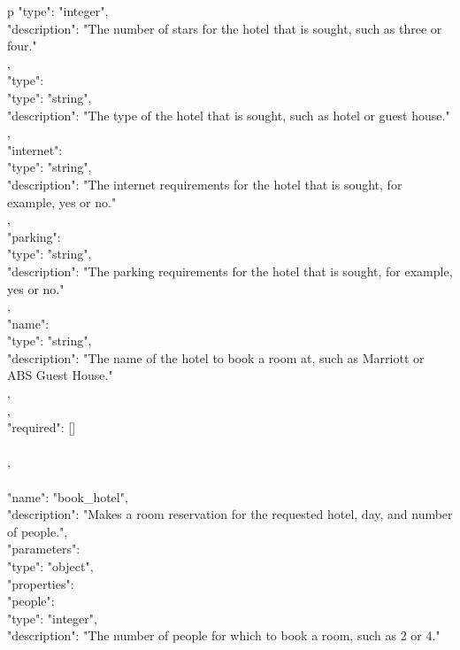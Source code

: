 \begin{table*}
\begin{tabular}{p\linewidth}
{{{{                    "type": "integer",\\
                    "description": "The number of stars for the hotel that is sought, such as three or four."\\
                },\\
                "type": {\\
                    "type": "string",\\
                    "description": "The type of the hotel that is sought, such as hotel or guest house."\\
                },\\
                "internet": {\\
                    "type": "string",\\
                    "description": "The internet requirements for the hotel that is sought, for example, yes or no."\\
                },\\
                "parking": {\\
                    "type": "string",\\
                    "description": "The parking requirements for the hotel that is sought, for example, yes or no."\\
                },\\
                "name": {\\
                    "type": "string",\\
                    "description": "The name of the hotel to book a room at, such as Marriott or ABS Guest House."\\
		        },\\
            },\\
            "required": []\\
        }\\
    },\\
    {\\
     	"name": "book\_hotel",\\
	    "description": "Makes a room reservation for the requested hotel, day, and number of people.",\\
	    "parameters": {\\
            "type": "object",\\
            "properties": {\\
		        "people": {\\
                    "type": "integer",\\
                    "description": "The number of people for which to book a room, such as 2 or 4."\\
}}}}
\end{tabular}
\end{table*}

